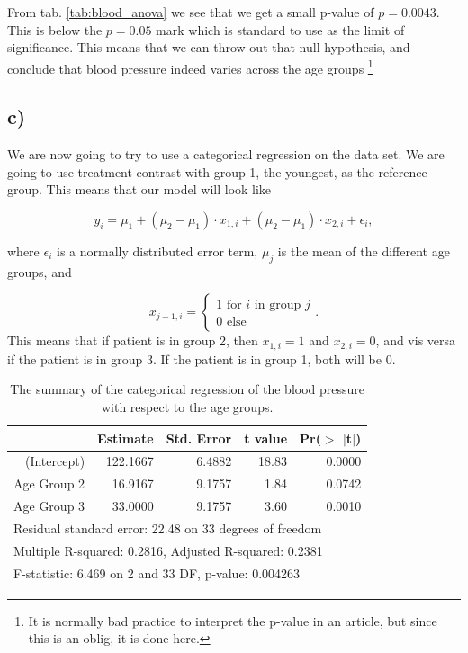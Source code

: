 \documentclass[a4paper,norsk, 10pt]{article}
\begin{document}
From tab. \ref{tab:blood_anova} we see that we get a small p-value of $p=0.0043$. This is below the $p=0.05$ mark which is standard to use as the limit of significance. This means that we can throw out that null hypothesis, and conclude that blood pressure indeed varies across the age groups \footnote{It is normally bad practice to interpret the p-value in an article, but since this is an oblig, it is done here.}


\subsection*{c)}

We are now going to try to use a categorical regression on the data set. We are going to use treatment-contrast with group 1, the youngest, as the reference group. This means that our model will look like

\begin{equation}
y_i = \mu_1 + (\mu_2-\mu_1)\cdot x_{1,i} + (\mu_2-\mu_1)\cdot x_{2,i} + \epsilon_i,
\end{equation}

where $\epsilon_i$ is a normally distributed error term, $\mu_j$ is the mean of the different age groups, and

\begin{equation}
x_{j-1,i} = 
\begin{cases}
1 \text{	for $i$ in group $j$} \\
0 \text{	else}
\end{cases}.
\end{equation}
This means that if patient is in group 2, then $x_{1,i} = 1$ and $x_{2,i} = 0$, and vis versa if the patient is in group 3. If the patient is in group 1, both will be $0$.

\begin{table}[!htbp]
\centering
\begin{tabular}{rrrrr}
  \hline
 & Estimate & Std. Error & t value & Pr($>$ $|$t$|$) \\ 
  \hline
(Intercept) & 122.1667 & 6.4882 & 18.83 & 0.0000 \\ 
  Age Group 2 & 16.9167 & 9.1757 & 1.84 & 0.0742 \\ 
  Age Group 3 & 33.0000 & 9.1757 & 3.60 & 0.0010 \\ 
  \hline
   \multicolumn{5}{l}{Residual standard error: 22.48 on 33 degrees of freedom} \\
	\multicolumn{5}{l}{Multiple R-squared:  0.2816,	Adjusted R-squared:  0.2381} \\
	\multicolumn{5}{l}{F-statistic: 6.469 on 2 and 33 DF,  p-value: 0.004263} \\
   \hline
\end{tabular}
\caption{The summary of the categorical regression of the blood pressure with respect to the age groups.}\label{tab:blood_reg}
\end{table}
\end{document}
